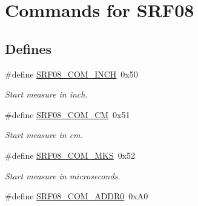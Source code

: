 \hypertarget{group___s_r_f08___c_o_m_m_a_n_d_s}{\section{\-Commands for \-S\-R\-F08}
\label{group___s_r_f08___c_o_m_m_a_n_d_s}
}
\subsection*{\-Defines}
\begin{DoxyCompactItemize}
\item 
\hypertarget{group___s_r_f08___c_o_m_m_a_n_d_s_ga44f876f131e733be4df50e3e76cbaff0}{\#define \hyperlink{group___s_r_f08___c_o_m_m_a_n_d_s_ga44f876f131e733be4df50e3e76cbaff0}{\-S\-R\-F08\-\_\-\-C\-O\-M\-\_\-\-I\-N\-C\-H}~0x50}\label{group___s_r_f08___c_o_m_m_a_n_d_s_ga44f876f131e733be4df50e3e76cbaff0}

\begin{DoxyCompactList}\small\item\em \-Start measure in inch. \end{DoxyCompactList}\item 
\hypertarget{group___s_r_f08___c_o_m_m_a_n_d_s_gac572f29f83e644f9111433f608b05942}{\#define \hyperlink{group___s_r_f08___c_o_m_m_a_n_d_s_gac572f29f83e644f9111433f608b05942}{\-S\-R\-F08\-\_\-\-C\-O\-M\-\_\-\-C\-M}~0x51}\label{group___s_r_f08___c_o_m_m_a_n_d_s_gac572f29f83e644f9111433f608b05942}

\begin{DoxyCompactList}\small\item\em \-Start measure in cm. \end{DoxyCompactList}\item 
\hypertarget{group___s_r_f08___c_o_m_m_a_n_d_s_ga88377c1ad512b37e58964c51fb680c4c}{\#define \hyperlink{group___s_r_f08___c_o_m_m_a_n_d_s_ga88377c1ad512b37e58964c51fb680c4c}{\-S\-R\-F08\-\_\-\-C\-O\-M\-\_\-\-M\-K\-S}~0x52}\label{group___s_r_f08___c_o_m_m_a_n_d_s_ga88377c1ad512b37e58964c51fb680c4c}

\begin{DoxyCompactList}\small\item\em \-Start measure in microseconds. \end{DoxyCompactList}\item 
\hypertarget{group___s_r_f08___c_o_m_m_a_n_d_s_ga82f1b0b1aab0b04fcecc5dbce53b1e8e}{\#define \hyperlink{group___s_r_f08___c_o_m_m_a_n_d_s_ga82f1b0b1aab0b04fcecc5dbce53b1e8e}{\-S\-R\-F08\-\_\-\-C\-O\-M\-\_\-\-A\-D\-D\-R0}~0x\-A0}\label{group___s_r_f08___c_o_m_m_a_n_d_s_ga82f1b0b1aab0b04fcecc5dbce53b1e8e}


\end{DoxyCompactItemize}
